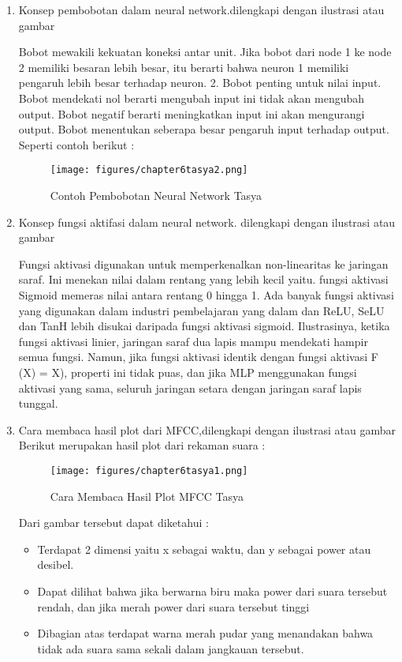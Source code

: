 \begin{enumerate}
\item Konsep pembobotan dalam neural network.dilengkapi dengan ilustrasi atau gambar
\par Bobot mewakili kekuatan koneksi antar unit. Jika bobot dari node 1 ke node 2 memiliki besaran lebih besar, itu berarti bahwa neuron 1 memiliki pengaruh lebih besar terhadap neuron. 2. Bobot penting untuk nilai input. Bobot mendekati nol berarti mengubah input ini tidak akan mengubah output. Bobot negatif berarti meningkatkan input ini akan mengurangi output. Bobot menentukan seberapa besar pengaruh input terhadap output. Seperti contoh berikut :
\begin{figure}[ht]
\centering
\texttt{[image: figures/chapter6tasya2.png]}
\caption{Contoh Pembobotan Neural Network Tasya}
\label{Teori}
\end{figure}

\item Konsep fungsi aktifasi dalam neural network. dilengkapi dengan ilustrasi atau gambar
\par Fungsi aktivasi digunakan untuk memperkenalkan non-linearitas ke jaringan saraf. Ini menekan nilai dalam rentang yang lebih kecil yaitu. fungsi aktivasi Sigmoid memeras nilai antara rentang 0 hingga 1. Ada banyak fungsi aktivasi yang digunakan dalam industri pembelajaran yang dalam dan ReLU, SeLU dan TanH lebih disukai daripada fungsi aktivasi sigmoid. Ilustrasinya, ketika fungsi aktivasi linier, jaringan saraf dua lapis mampu mendekati hampir semua fungsi. Namun, jika fungsi aktivasi identik dengan fungsi aktivasi F (X) = X), properti ini tidak puas, dan jika MLP menggunakan fungsi aktivasi yang sama, seluruh jaringan setara dengan jaringan saraf lapis tunggal.

\item Cara membaca hasil plot dari MFCC,dilengkapi dengan ilustrasi atau gambar
Berikut merupakan hasil plot dari rekaman suara :
\begin{figure}[ht]
\centering
\texttt{[image: figures/chapter6tasya1.png]}
\caption{Cara Membaca Hasil Plot MFCC Tasya}
\label{Teori}
\end{figure}
Dari gambar tersebut dapat diketahui :
\begin{itemize}
\item Terdapat 2 dimensi yaitu x sebagai waktu, dan y sebagai power atau desibel.
\item Dapat dilihat bahwa jika berwarna biru maka power dari suara tersebut rendah, dan jika merah power dari suara tersebut tinggi
\item Dibagian atas terdapat warna merah pudar yang menandakan bahwa tidak ada suara sama sekali dalam jangkauan tersebut.
\end{itemize}


\end{enumerate}
